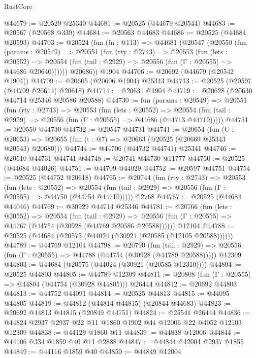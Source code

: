 \begin{lexlean}{RustCore}
\begin{coremodule}
@44679 := @20529 @25340
@44681 := @20525 (@44679 @20544)
@44683 := @20567 (@20568 @339)
@44684 := @20563 @44683
@44686 := @20525 (@44684 @20593)
@44703 := @20524
    (fun (fn : @113) =>
    @44681
      (@20547
        (@20550
          (fun (params : @20549) =>
          @20551
            (fun (rty : @2743) =>
            @20553
              (fun (lets : @20552) =>
              @20554 (fun (tail : @2929) => @20556 (fun (Γ : @20555) => @44686 @20640))))))
        @20686))
    @1904
@44706 := @20692 (@44679 (@20542 @1904))
@44709 := @20605 (@20606 @1904) @25343
@44713 := @20525 (@20597 (@44709 @20614) @20618)
@44714 := @20631 @1904
@44719 := @20628 (@20630 @44714 @25346 @20586 @20588)
@44730 := fun (params : @20549) =>
  @20551
    (fun (rty : @2743) =>
    @20553
      (fun (lets : @20552) =>
      @20554 (fun (tail : @2929) => @20556 (fun (Γ : @20555) => @44686 (@44713 @44719)))))
@44731 := @20550 @44730
@44732 := @20547 @44731
@44741 := @20654
    (fun (U : @20653) => @20655 (fun (t : @7) => @20663 (@20525 (@20669 @25343 @20543) @20680)))
@44744 := @44706 (@44732 @44741) @25341
@44746 := @20510 @44731 @44741
@44748 := @20741 @44730 @11777
@44750 := @20525 (@44684 @44026)
@44751 := @44709 @44029
@44752 := @20597 @44751
@44754 := @20525 (@44752 @20618)
@44765 := @20744
    (fun (rty : @2743) =>
    @20553
      (fun (lets : @20552) =>
      @20554 (fun (tail : @2929) => @20556 (fun (Γ : @20555) => @44750 (@44754 @44719)))))
    @2768
@44767 := @20525 (@44684 @44046)
@44769 := @30929 @44714 @25346
@44781 := @20766
    (fun (lets : @20552) =>
    @20554
      (fun (tail : @2929) =>
      @20556 (fun (Γ : @20555) => @44767 (@44754 (@30928 (@44769 @20586 @20588))))))
    @12104
@44788 := @20525 (@44684 (@20575 (@44024 (@30921 (@20585 (@12105 @20588))))))
@44789 := @44769 @12104
@44798 := @20790
    (fun (tail : @2929) => @20556 (fun (Γ : @20555) => @44788 (@44754 (@30928 (@44789 @20588)))))
    @12309
@44803 := @44684 (@20575 (@44024 (@30921 (@20585 @12310))))
@44804 := @20525 @44803
@44805 := @44789 @12309
@44811 := @20808 (fun (Γ : @20555) => @44804 (@44754 (@30928 @44805))) @26444
@44812 := @20692 @44803
@44813 := @44752 @44091
@44814 := @20525 @44813
@44815 := @44095 @44805
@44819 := @44812 (@44814 @44815) (@20844 @44683)
@44823 := @20692 @44813 @44815 (@20849 @44751)
@44824 := @25541 @26444
@44836 := @44824 @2937 @2937 @22 @11 @1860 @1902 @44 @12006 @22 @4052 @12103 @12309
@44838 := @44129 @1860 @11
@44839 := @44838 @12006
@44844 := @44106 @334 @1859 @40 @11 @2888
@44847 := @44844 @12004 @2937 @1855
@44849 := @44116 @1859 @40
@44850 := @44849 @12004

\end{coremodule}
\end{lexlean}
